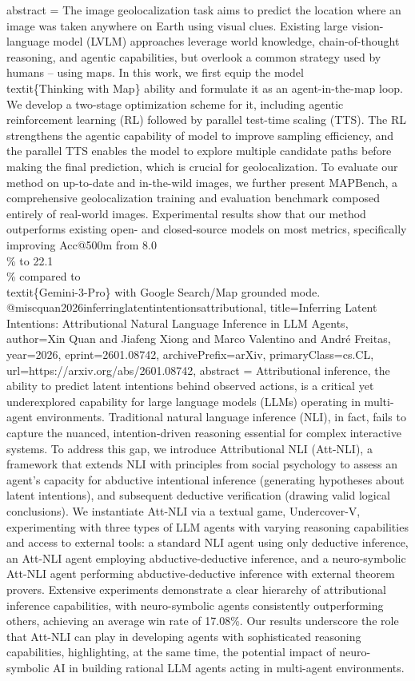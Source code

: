 {      abstract = {The image geolocalization task aims to predict the location where an image was taken anywhere on Earth using visual clues. Existing large vision-language model (LVLM) approaches leverage world knowledge, chain-of-thought reasoning, and agentic capabilities, but overlook a common strategy used by humans -- using maps. In this work, we first equip the model \\textit\{Thinking with Map\} ability and formulate it as an agent-in-the-map loop. We develop a two-stage optimization scheme for it, including agentic reinforcement learning (RL) followed by parallel test-time scaling (TTS). The RL strengthens the agentic capability of model to improve sampling efficiency, and the parallel TTS enables the model to explore multiple candidate paths before making the final prediction, which is crucial for geolocalization. To evaluate our method on up-to-date and in-the-wild images, we further present MAPBench, a comprehensive geolocalization training and evaluation benchmark composed entirely of real-world images. Experimental results show that our method outperforms existing open- and closed-source models on most metrics, specifically improving Acc@500m from 8.0\\\% to 22.1\\\% compared to \\textit\{Gemini-3-Pro\} with Google Search/Map grounded mode.}
}@misc{quan2026inferringlatentintentionsattributional,
      title={Inferring Latent Intentions: Attributional Natural Language Inference in LLM Agents}, 
      author={Xin Quan and Jiafeng Xiong and Marco Valentino and André Freitas},
      year={2026},
      eprint={2601.08742},
      archivePrefix={arXiv},
      primaryClass={cs.CL},
      url={https://arxiv.org/abs/2601.08742},
      abstract = {Attributional inference, the ability to predict latent intentions behind observed actions, is a critical yet underexplored capability for large language models (LLMs) operating in multi-agent environments. Traditional natural language inference (NLI), in fact, fails to capture the nuanced, intention-driven reasoning essential for complex interactive systems. To address this gap, we introduce Attributional NLI (Att-NLI), a framework that extends NLI with principles from social psychology to assess an agent's capacity for abductive intentional inference (generating hypotheses about latent intentions), and subsequent deductive verification (drawing valid logical conclusions). We instantiate Att-NLI via a textual game, Undercover-V, experimenting with three types of LLM agents with varying reasoning capabilities and access to external tools: a standard NLI agent using only deductive inference, an Att-NLI agent employing abductive-deductive inference, and a neuro-symbolic Att-NLI agent performing abductive-deductive inference with external theorem provers. Extensive experiments demonstrate a clear hierarchy of attributional inference capabilities, with neuro-symbolic agents consistently outperforming others, achieving an average win rate of 17.08\%. Our results underscore the role that Att-NLI can play in developing agents with sophisticated reasoning capabilities, highlighting, at the same time, the potential impact of neuro-symbolic AI in building rational LLM agents acting in multi-agent environments.}
}
